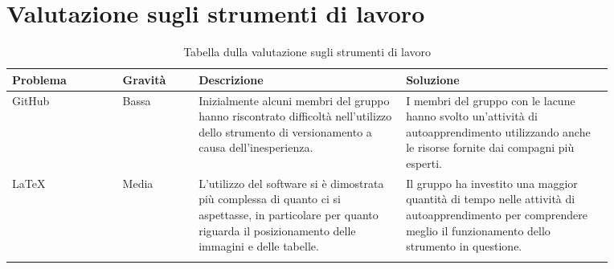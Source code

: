 \section{Valutazione sugli strumenti di lavoro}
\begin{center}
    \renewcommand{\arraystretch}{1.25}
    \begin{table}[H]
        \centering
        \begin{longtable}{|p{0.16\linewidth}|p{0.11\linewidth}|p{0.3\linewidth}|p{0.3\linewidth}|}
        \hline
        \rowcolor[HTML]{036400}
        {\color[HTML]{EFEFEF} \textbf{Problema}} & {\color[HTML]{EFEFEF} \textbf{Gravità}} & {\color[HTML]{EFEFEF} \textbf{Descrizione}} & {\color[HTML]{EFEFEF} \textbf{Soluzione}} \\ \hline
        \rowcolor[HTML]{EFEFEF}
        GitHub & Bassa & Inizialmente alcuni membri del gruppo hanno riscontrato difficoltà nell'utilizzo dello strumento di versionamento a causa dell'inesperienza. & I membri del gruppo con le lacune hanno svolto un'attività di autoapprendimento utilizzando anche le risorse fornite dai compagni più esperti. \\ \hline
        \rowcolor[HTML]{C0C0C0}
        \LaTeX & Media & L'utilizzo del software si è dimostrata più complessa di quanto ci si aspettasse, in particolare per quanto riguarda il posizionamento delle immagini e delle tabelle. & Il gruppo ha investito una maggior quantità di tempo nelle attività di autoapprendimento per comprendere meglio il funzionamento dello strumento in questione. \\ \hline
        \caption{Tabella dulla valutazione sugli strumenti di lavoro}
        \end{longtable}
    \end{table}
\end{center}